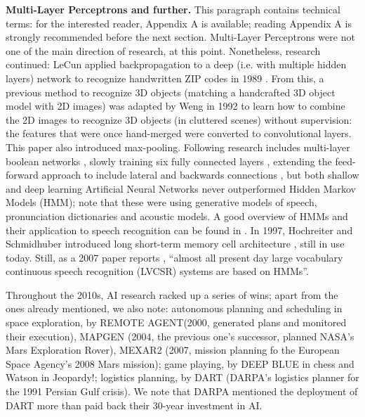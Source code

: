 \documentclass[../main.tex]{subfiles}
\begin{document}
\vspace{4pt}
\textbf{Multi-Layer Perceptrons and further.}
This paragraph contains technical terms: for the interested reader, Appendix A is available; reading Appendix A is strongly recommended before the next section. Multi-Layer Perceptrons were not one of the main direction of research, at this point. Nonetheless, research continued: LeCun applied backpropagation to a deep (i.e. with multiple hidden layers) network to recognize handwritten ZIP codes in 1989 \parencite{lecunBackpropagationAppliedHandwritten1989}. From this, a previous method to recognize 3D objects (matching a handcrafted 3D object model with 2D images) was adapted by Weng in 1992 \parencite{wengCresceptronSelforganizingNeural1992} to learn how to combine the 2D images to recognize 3D objects (in cluttered scenes) without supervision: the features that were once hand-merged were converted to convolutional layers. This paper also introduced max-pooling. Following research includes multi-layer boolean networks \parencite{decarvalhoIntegratedBooleanNeural1994}, slowly training six fully connected layers \parencite{hintonWakesleepAlgorithmUnsupervised1995}, extending the feed-forward approach to include lateral and backwards connections \parencite{behnkeNeuralAbstractionPyramid2003}, but both shallow and deep learning Artificial Neural Networks never outperformed Hidden Markov Models (HMM); note that these were using generative models of speech, pronunciation dictionaries and acoustic models. A good overview of HMMs and their application to speech recognition can be found in  \parencite{galesApplicationHiddenMarkov2007a}.
In 1997, Hochreiter and Schmidhuber introduced long short-term memory cell architecture \parencite{hochreiterLongShortTermMemory1997}, still in use today. Still, as a 2007 paper reports  \parencite{galesApplicationHiddenMarkov2007}, \enquote{almost all present day large vocabulary continuous speech recognition (LVCSR) systems are based on HMMs}.

\vspace{4pt}
Throughout the 2010s, AI research racked up a series of wins; apart from the ones already mentioned, we also note: autonomous planning and scheduling in space exploration, by REMOTE AGENT(2000, generated plans and monitored their execution), MAPGEN (2004, the previous one's successor, planned NASA's Mars Exploration Rover), MEXAR2 (2007, mission planning fo the European Space Agency's 2008 Mars mission); game playing, by DEEP BLUE in chess and Watson in Jeopardy!; logistics planning, by DART (DARPA's logistics planner for the 1991 Persian Gulf crisis). We note that DARPA mentioned the deployment of DART more than paid back their 30-year investment in AI.
\end{document}
